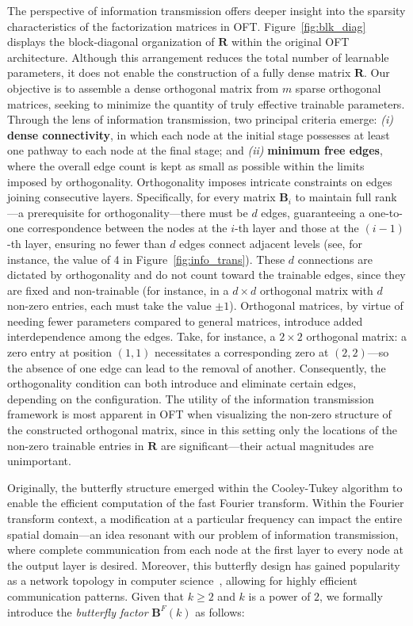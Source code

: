 The perspective of information transmission offers deeper insight into the sparsity characteristics of the factorization matrices in OFT. Figure~\ref{fig:blk_diag} displays the block-diagonal organization of $\bm{R}$ within the original OFT architecture. Although this arrangement reduces the total number of learnable parameters, it does not enable the construction of a fully dense matrix $\bm{R}$. Our objective is to assemble a dense orthogonal matrix from $m$ sparse orthogonal matrices, seeking to minimize the quantity of truly effective trainable parameters. Through the lens of information transmission, two principal criteria emerge: \emph{(i)} \textbf{dense connectivity}, in which each node at the initial stage possesses at least one pathway to each node at the final stage; and \emph{(ii)} \textbf{minimum free edges}, where the overall edge count is kept as small as possible within the limits imposed by orthogonality. Orthogonality imposes intricate constraints on edges joining consecutive layers. Specifically, for every matrix $\bm{B}_i$ to maintain full rank—a prerequisite for orthogonality—there must be $d$ edges, guaranteeing a one-to-one correspondence between the nodes at the $i$-th layer and those at the $(i-1)$-th layer, ensuring no fewer than $d$ edges connect adjacent levels (see, for instance, the value of 4 in Figure~\ref{fig:info_trans}). These $d$ connections are dictated by orthogonality and do not count toward the trainable edges, since they are fixed and non-trainable (for instance, in a $d\times d$ orthogonal matrix with $d$ non-zero entries, each must take the value $\pm 1$). Orthogonal matrices, by virtue of needing fewer parameters compared to general matrices, introduce added interdependence among the edges. Take, for instance, a $2\times 2$ orthogonal matrix: a zero entry at position $(1,1)$ necessitates a corresponding zero at $(2,2)$—so the absence of one edge can lead to the removal of another. Consequently, the orthogonality condition can both introduce and eliminate certain edges, depending on the configuration. The utility of the information transmission framework is most apparent in OFT when visualizing the non-zero structure of the constructed orthogonal matrix, since in this setting only the locations of the non-zero trainable entries in $\bm{R}$ are significant—their actual magnitudes are unimportant.

Originally, the butterfly structure emerged within the Cooley-Tukey algorithm to enable the efficient computation of the fast Fourier transform. Within the Fourier transform context, a modification at a particular frequency can impact the entire spatial domain—an idea resonant with our problem of information transmission, where complete communication from each node at the first layer to every node at the output layer is desired. Moreover, this butterfly design has gained popularity as a network topology in computer science~\cite{solihin2015fundamentals,li2011linear}, allowing for highly efficient communication patterns. Given that $k \geq 2$ and $k$ is a power of $2$, we formally introduce the \emph{butterfly factor} $\bm{B}^F(k)$ as follows:

